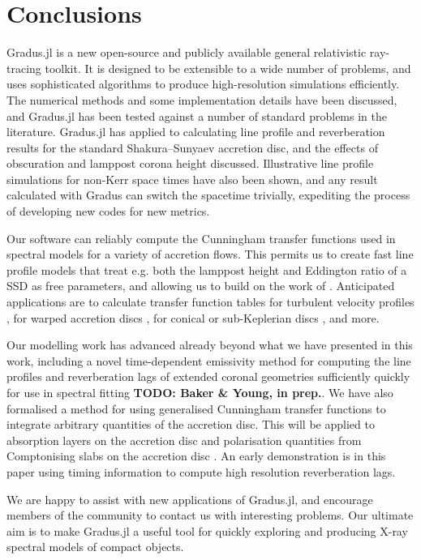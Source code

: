 \documentclass[fleqn,usenatbib]{mnras}
\newcommand{\todo}[1]{{\noindent \bf \color{red} TODO: #1}}
\newcommand{\Gradus}{{\sc Gradus.jl}\xspace}
\begin{document}
\section{Conclusions}
\label{sec:conclusion}

\Gradus is a new open-source and publicly available general relativistic
ray-tracing toolkit. It is designed to be extensible to a wide number of
problems, and uses sophisticated algorithms to produce high-resolution
simulations efficiently. The numerical methods and some implementation details
have been discussed, and \Gradus has been tested against a number of standard
problems in the literature. \Gradus has applied to calculating line profile and
reverberation results for the standard Shakura--Sunyaev accretion disc, and the
effects of obscuration and lamppost corona height discussed. Illustrative line
profile simulations for non-Kerr space times have also been shown, and any
result calculated with Gradus can switch the spacetime trivially, expediting
the process of developing new codes for new metrics.

Our software can reliably compute the Cunningham transfer functions used in
spectral models for a variety of accretion flows. This permits us to create fast
line profile models that treat e.g. both the lamppost height and Eddington
ratio of a SSD as free parameters, and allowing us to build on the work of
\citet{jiang_black_20222}. Anticipated applications are to calculate
transfer function tables for turbulent velocity profiles
\citep{pariev_line_1998}, for warped accretion discs
\citep[e.g.][]{hartnoll_reprocessed_2001}, for conical or sub-Keplerian discs
\citep[e.g.][]{wu_iron_2007}, and more.

Our modelling work has advanced already beyond what we have presented in this
work, including a novel time-dependent emissivity method for computing the line
profiles and reverberation lags of extended coronal geometries sufficiently
quickly for use in spectral fitting \todo{Baker \& Young, in prep.}. We have
also formalised a method for using generalised Cunningham transfer functions to
integrate arbitrary quantities of the accretion disc. This will be applied to
absorption layers on the accretion disc \citep{fabian_blueshifted_2020} and
polarisation quantities from Comptonising slabs on the accretion disc
\citep[e.g.][]{poutanen_the_1996}. An early demonstration is in this paper using
timing information to compute high resolution reverberation lags.

We are happy to assist with new applications of \Gradus, and encourage members
of the community to contact us with interesting problems. Our ultimate aim is to
make \Gradus a useful tool for quickly exploring and producing X-ray spectral
models of compact objects.
\end{document}
